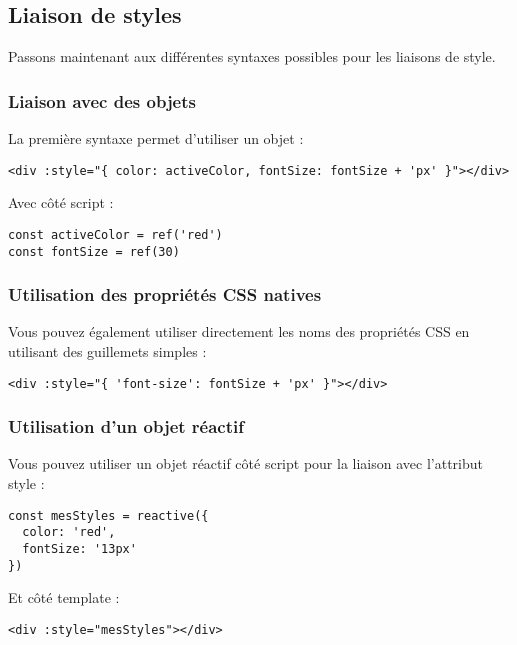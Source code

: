 \subsection{Liaison de styles}
Passons maintenant aux différentes syntaxes possibles pour les liaisons de style.

\subsubsection{Liaison avec des objets}
La première syntaxe permet d'utiliser un objet :
\begin{verbatim}
<div :style="{ color: activeColor, fontSize: fontSize + 'px' }"></div>
\end{verbatim}

Avec côté {\color{monOrange}script} :
\begin{verbatim}
const activeColor = ref('red')
const fontSize = ref(30)
\end{verbatim}

\subsubsection{Utilisation des propriétés CSS natives}
Vous pouvez également utiliser directement les noms des propriétés CSS en utilisant des guillemets simples :
\begin{verbatim}
<div :style="{ 'font-size': fontSize + 'px' }"></div>
\end{verbatim}

\subsubsection{Utilisation d'un objet réactif}
Vous pouvez utiliser un objet réactif côté script pour la liaison avec l'attribut {\color{monOrange}style} :
\begin{verbatim}
const mesStyles = reactive({
  color: 'red',
  fontSize: '13px'
})
\end{verbatim}
Et côté {\color{monOrange}template} :
\begin{verbatim}
<div :style="mesStyles"></div>
\end{verbatim}

